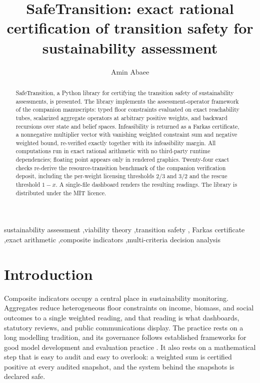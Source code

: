 \documentclass[3p,11pt]{elsarticle}
\begin{document}
\begin{frontmatter}

\title{SafeTransition: exact rational certification of transition safety for
sustainability assessment}

\author[aff]{Amin Abaee}
\address[aff]{Independent Researcher,
\href{https://orcid.org/0000-0002-0019-1842}{ORCID: 0000-0002-0019-1842},
\href{mailto:amin\_abaee@ut.ac.ir}{amin\_abaee@ut.ac.ir}}

\begin{abstract}
SafeTransition, a Python library for certifying the transition safety of
sustainability assessments, is presented. The library implements the
assessment-operator framework of the companion manuscripts: typed floor
constraints evaluated on exact reachability tubes, scalarized aggregate
operators at arbitrary positive weights, and backward recursions over state
and belief spaces. Infeasibility is returned as a Farkas certificate, a
nonnegative multiplier vector with vanishing weighted constraint sum and
negative weighted bound, re-verified exactly together with its infeasibility
margin. All computations run in exact rational arithmetic with no third-party
runtime dependencies; floating point appears only in rendered graphics. Twenty-four exact checks re-derive the
resource-transition benchmark of the companion verification deposit,
including the per-weight licensing thresholds $2/3$ and $3/2$ and the rescue
threshold $1-x$. A single-file dashboard renders the resulting readings.
The library is distributed under the MIT licence.
\end{abstract}

\begin{keyword}
sustainability assessment \sep viability theory \sep transition safety \sep
Farkas certificate \sep exact arithmetic \sep composite indicators
\sep multi-criteria decision analysis
\end{keyword}

\end{frontmatter}

\section{Introduction}\label{sec:introduction}

Composite indicators occupy a central place in sustainability monitoring.
Aggregates reduce heterogeneous floor constraints on income, biomass, and
social outcomes to a single weighted reading, and that reading is what
dashboards, statutory reviews, and public communications display. The
practice rests on a long modelling tradition, and its governance follows
established frameworks for good model development and evaluation practice
\citep{Jakeman2006}. It also rests on a mathematical step that
is easy to audit and easy to overlook: a weighted sum is certified positive
at every audited snapshot, and the system behind the snapshots is declared
safe.
\end{document}
